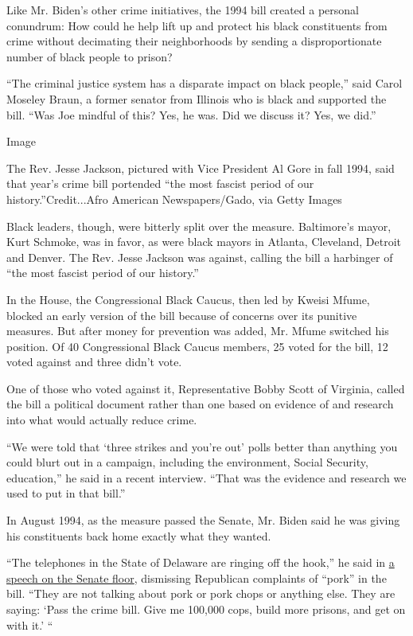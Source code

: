 Like Mr. Biden's other crime initiatives, the 1994 bill created a
personal conundrum: How could he help lift up and protect his black
constituents from crime without decimating their neighborhoods by
sending a disproportionate number of black people to prison?

``The criminal justice system has a disparate impact on black people,''
said Carol Moseley Braun, a former senator from Illinois who is black
and supported the bill. ``Was Joe mindful of this? Yes, he was. Did we
discuss it? Yes, we did.''

Image

The Rev. Jesse Jackson, pictured with Vice President Al Gore in fall
1994, said that year's crime bill portended ``the most fascist period of
our history.''Credit...Afro American Newspapers/Gado, via Getty Images

Black leaders, though, were bitterly split over the measure. Baltimore's
mayor, Kurt Schmoke, was in favor, as were black mayors in Atlanta,
Cleveland, Detroit and Denver. The Rev. Jesse Jackson was against,
calling the bill a harbinger of ``the most fascist period of our
history.''

In the House, the Congressional Black Caucus, then led by Kweisi Mfume,
blocked an early version of the bill because of concerns over its
punitive measures. But after money for prevention was added, Mr. Mfume
switched his position. Of 40 Congressional Black Caucus members, 25
voted for the bill, 12 voted against and three didn't vote.

One of those who voted against it, Representative Bobby Scott of
Virginia, called the bill a political document rather than one based on
evidence of and research into what would actually reduce crime.

``We were told that `three strikes and you're out' polls better than
anything you could blurt out in a campaign, including the environment,
Social Security, education,'' he said in a recent interview. ``That was
the evidence and research we used to put in that bill.''

In August 1994, as the measure passed the Senate, Mr. Biden said he was
giving his constituents back home exactly what they wanted.

``The telephones in the State of Delaware are ringing off the hook,'' he
said in
\href{https://www.nytimes3xbfgragh.onion/1994/08/26/us/decision-in-the-senate-the-vote-election-season-concerns-help-carry-crime-bill.html}{a
speech on the Senate floor}, dismissing Republican complaints of
``pork'' in the bill. ``They are not talking about pork or pork chops or
anything else. They are saying: `Pass the crime bill. Give me 100,000
cops, build more prisons, and get on with it.' ``

